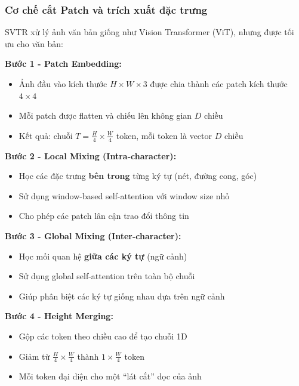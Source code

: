 \subsubsection{Cơ chế cắt Patch và trích xuất đặc trưng}

SVTR xử lý ảnh văn bản giống như Vision Transformer (ViT), nhưng được tối ưu cho văn bản:

\textbf{Bước 1 - Patch Embedding:}
\begin{itemize}
    \item Ảnh đầu vào kích thước $H \times W \times 3$ được chia thành các patch kích thước $4 \times 4$
    \item Mỗi patch được flatten và chiếu lên không gian $D$ chiều
    \item Kết quả: chuỗi $T = \frac{H}{4} \times \frac{W}{4}$ token, mỗi token là vector $D$ chiều
\end{itemize}

\textbf{Bước 2 - Local Mixing (Intra-character):}
\begin{itemize}
    \item Học các đặc trưng \textbf{bên trong} từng ký tự (nét, đường cong, góc)
    \item Sử dụng window-based self-attention với window size nhỏ
    \item Cho phép các patch lân cận trao đổi thông tin
\end{itemize}

\textbf{Bước 3 - Global Mixing (Inter-character):}
\begin{itemize}
    \item Học mối quan hệ \textbf{giữa các ký tự} (ngữ cảnh)
    \item Sử dụng global self-attention trên toàn bộ chuỗi
    \item Giúp phân biệt các ký tự giống nhau dựa trên ngữ cảnh
\end{itemize}

\textbf{Bước 4 - Height Merging:}
\begin{itemize}
    \item Gộp các token theo chiều cao để tạo chuỗi 1D
    \item Giảm từ $\frac{H}{4} \times \frac{W}{4}$ thành $1 \times \frac{W}{4}$ token
    \item Mỗi token đại diện cho một ``lát cắt'' dọc của ảnh
\end{itemize}


